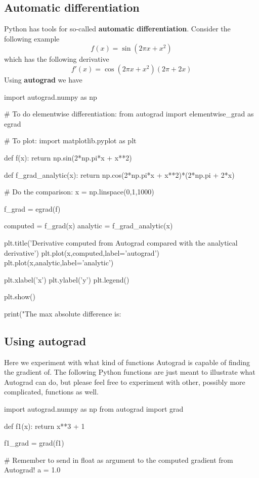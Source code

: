 \documentclass[%
oneside,                 %
final,                   %
10pt]{article}
\begin{document}
\subsection{Automatic differentiation}
Python has tools for so-called \textbf{automatic differentiation}.
Consider the following example
\[
f(x) = \sin\left(2\pi x + x^2\right)
\]
which has the following derivative
\[
f'(x) = \cos\left(2\pi x + x^2\right)\left(2\pi + 2x\right) 
\]
Using \textbf{autograd} we have

\bpycod
import autograd.numpy as np

# To do elementwise differentiation:
from autograd import elementwise_grad as egrad 

# To plot:
import matplotlib.pyplot as plt 


def f(x):
    return np.sin(2*np.pi*x + x**2)

def f_grad_analytic(x):
    return np.cos(2*np.pi*x + x**2)*(2*np.pi + 2*x)

# Do the comparison:
x = np.linspace(0,1,1000)

f_grad = egrad(f)

computed = f_grad(x)
analytic = f_grad_analytic(x)

plt.title('Derivative computed from Autograd compared with the analytical derivative')
plt.plot(x,computed,label='autograd')
plt.plot(x,analytic,label='analytic')

plt.xlabel('x')
plt.ylabel('y')
plt.legend()

plt.show()

print("The max absolute difference is: %
\epycod

\subsection{Using autograd}

Here we
experiment with what kind of functions Autograd is capable
of finding the gradient of. The following Python functions are just
meant to illustrate what Autograd can do, but please feel free to
experiment with other, possibly more complicated, functions as well.

\bpycod
import autograd.numpy as np
from autograd import grad

def f1(x):
    return x**3 + 1

f1_grad = grad(f1)

# Remember to send in float as argument to the computed gradient from Autograd!
a = 1.0
\end{document}
